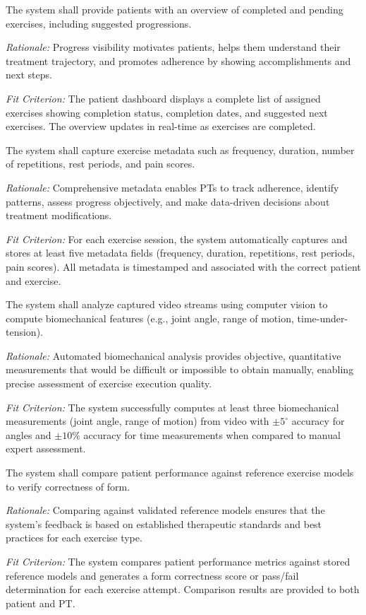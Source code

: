 \documentclass[12pt]{article}
\newcommand{\rationale}[1]{\par\emph{Rationale:} #1}
\newcommand{\fitcrit}[1]{\par\emph{Fit Criterion:} #1}
\begin{document}
\begin{reqlist}
	\item[FR 10.] The system shall provide patients with an overview of completed and pending exercises, including suggested progressions.
	\rationale{Progress visibility motivates patients, helps them understand their treatment trajectory, and promotes adherence by showing accomplishments and next steps.}
	\fitcrit{The patient dashboard displays a complete list of assigned exercises showing completion status, completion dates, and suggested next exercises. The overview updates in real-time as exercises are completed.}
	
	\item[FR 11.] The system shall capture exercise metadata such as frequency, duration, number of repetitions, rest periods, and pain scores.
	\rationale{Comprehensive metadata enables PTs to track adherence, identify patterns, assess progress objectively, and make data-driven decisions about treatment modifications.}
	\fitcrit{For each exercise session, the system automatically captures and stores at least five metadata fields (frequency, duration, repetitions, rest periods, pain scores). All metadata is timestamped and associated with the correct patient and exercise.}
	
	\item[FR 12.] The system shall analyze captured video streams using computer vision to compute biomechanical features (e.g., joint angle, range of motion, time-under-tension).
	\rationale{Automated biomechanical analysis provides objective, quantitative measurements that would be difficult or impossible to obtain manually, enabling precise assessment of exercise execution quality.}
	\fitcrit{The system successfully computes at least three biomechanical measurements (joint angle, range of motion) from video with $\pm5^\circ$ accuracy for angles and $\pm10\%$ accuracy for time measurements when compared to manual expert assessment.}
	
	\item[FR 13.] The system shall compare patient performance against reference exercise models to verify correctness of form.
	\rationale{Comparing against validated reference models ensures that the system's feedback is based on established therapeutic standards and best practices for each exercise type.}
	\fitcrit{The system compares patient performance metrics against stored reference models and generates a form correctness score or pass/fail determination for each exercise attempt. Comparison results are provided to both patient and PT.}
	

\end{reqlist}
\end{document}
